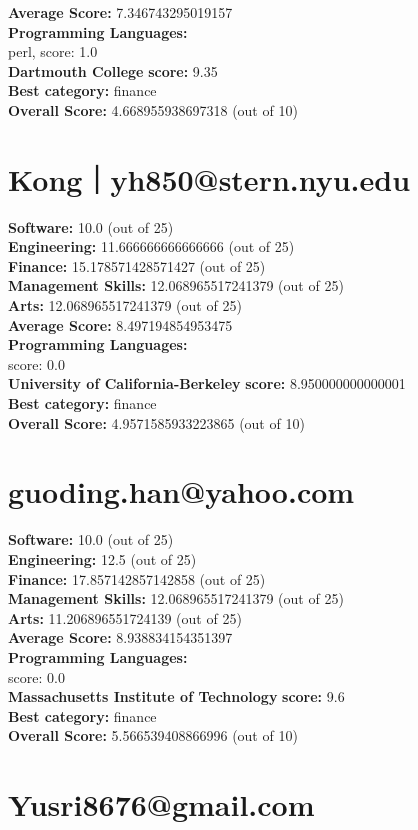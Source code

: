 \documentclass{article}
\begin{document}
\textbf{Average Score: } 7.346743295019157\\
\textbf{Programming Languages:} \\
perl, score: 1.0\\
\textbf{Dartmouth College} \textbf{score:} 9.35\\
\textbf{Best category: } finance\\
\textbf{Overall Score: }4.668955938697318 (out of 10)\section{Kong｜yh850@stern.nyu.edu}
\textbf{Software:} 10.0 (out of 25)\\
\textbf{Engineering: } 11.666666666666666 (out of 25)\\
\textbf{Finance:} 15.178571428571427 (out of 25)\\
\textbf{Management Skills:} 12.068965517241379 (out of 25)\\
\textbf{Arts:} 12.068965517241379 (out of 25)\\
\textbf{Average Score: } 8.497194854953475\\
\textbf{Programming Languages:} \\
score: 0.0\\
\textbf{University of California-Berkeley} \textbf{score:} 8.950000000000001\\
\textbf{Best category: } finance\\
\textbf{Overall Score: }4.9571585933223865 (out of 10)\section{guoding.han@yahoo.com}
\textbf{Software:} 10.0 (out of 25)\\
\textbf{Engineering: } 12.5 (out of 25)\\
\textbf{Finance:} 17.857142857142858 (out of 25)\\
\textbf{Management Skills:} 12.068965517241379 (out of 25)\\
\textbf{Arts:} 11.206896551724139 (out of 25)\\
\textbf{Average Score: } 8.938834154351397\\
\textbf{Programming Languages:} \\
score: 0.0\\
\textbf{Massachusetts Institute of Technology} \textbf{score:} 9.6\\
\textbf{Best category: } finance\\
\textbf{Overall Score: }5.566539408866996 (out of 10)\section{Yusri8676@gmail.com}
\end{document}
